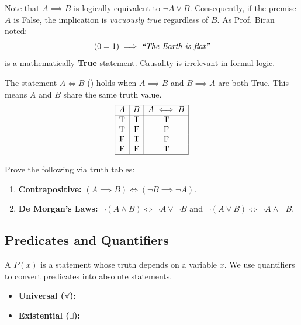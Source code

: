 \begin{remark}
Note that $A \implies B$ is logically equivalent to $\neg A \vee B$. Consequently, if the premise $A$ is False, the implication is \textit{vacuously true} regardless of $B$. As Prof. Biran noted:
\[
(0=1) \implies \textit{``\text{The Earth is flat}''}
\]
is a mathematically \textbf{True} statement. Causality is irrelevant in formal logic.
\end{remark}

\begin{definition}[Equivalence]
The statement $A \iff B$ () holds when $A \implies B$ and $B \implies A$ are both True. This means $A$ and $B$ share the same truth value.
\[
\begin{array}{|c|c|c|}
\hline
A & B & A \iff B \\
\hline
\text{T} & \text{T} & \text{T} \\
\text{T} & \text{F} & \text{F} \\
\text{F} & \text{T} & \text{F} \\
\text{F} & \text{F} & \text{T} \\
\hline
\end{array}
\]
\end{definition}

\begin{exercise}
Prove the following via truth tables:
\begin{enumerate}
    \item \textbf{Contrapositive:} $(A \implies B) \iff (\neg B \implies \neg A)$.
    \item \textbf{De Morgan's Laws:} $\neg(A \wedge B) \iff \neg A \vee \neg B$ and $\neg(A \vee B) \iff \neg A \wedge \neg B$.
\end{enumerate}
\end{exercise}

\subsection{Predicates and Quantifiers}

A  $P(x)$ is a statement whose truth depends on a variable $x$. We use quantifiers to convert predicates into absolute statements.

\begin{definition}[Quantifiers]
\begin{itemize}
    \item \textbf{Universal ($\forall$):} 
    \item \textbf{Existential ($\exists$):} 
\end{itemize}
\end{definition}

